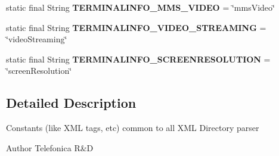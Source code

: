 \begin{DoxyCompactItemize}
\item 
\hypertarget{classcom_1_1bluevia_1_1directory_1_1data_1_1FilterConstants_adddca288cb141ddb7d4b54f06c2d9e8b}{
static final String {\bfseries TERMINALINFO\_\-MMS\_\-VIDEO} = \char`\"{}mmsVideo\char`\"{}}
\label{classcom_1_1bluevia_1_1directory_1_1data_1_1FilterConstants_adddca288cb141ddb7d4b54f06c2d9e8b}

\item 
\hypertarget{classcom_1_1bluevia_1_1directory_1_1data_1_1FilterConstants_a9d003c136f481d312923942c99294681}{
static final String {\bfseries TERMINALINFO\_\-VIDEO\_\-STREAMING} = \char`\"{}videoStreaming\char`\"{}}
\label{classcom_1_1bluevia_1_1directory_1_1data_1_1FilterConstants_a9d003c136f481d312923942c99294681}

\item 
\hypertarget{classcom_1_1bluevia_1_1directory_1_1data_1_1FilterConstants_adc4c336f3dfe35a05328ec7772917579}{
static final String {\bfseries TERMINALINFO\_\-SCREENRESOLUTION} = \char`\"{}screenResolution\char`\"{}}
\label{classcom_1_1bluevia_1_1directory_1_1data_1_1FilterConstants_adc4c336f3dfe35a05328ec7772917579}

\end{DoxyCompactItemize}


\subsection{Detailed Description}
Constants (like XML tags, etc) common to all XML Directory parser

\begin{DoxyAuthor}{Author}
Telefonica R\&D 
\end{DoxyAuthor}
